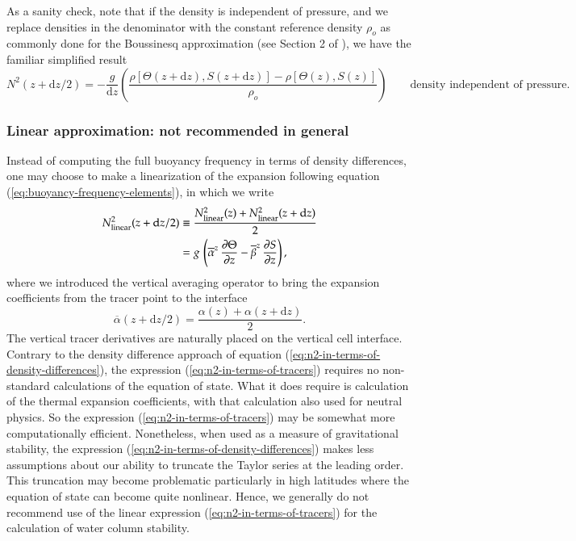 \normalsize As a sanity check, note that if the density is independent
of pressure, and we replace densities in the denominator with the
constant reference density $\rho_{o}$ as commonly done for the
Boussinesq approximation (see Section 2 of \cite{Roquet_etal2014}), we
have the familiar simplified result
\begin{equation}
N^{2}(z+\mathrm{d}z/2) = -\frac{g}{\mathrm{d}z} 
  \left( 
 \frac{ \rho[ \Theta(z + \mathrm{d} z), S(z + \mathrm{d} z)]  -\rho[ \Theta(z), S(z)]  }{\rho_{o}}
 \right)    \qquad   \mbox{density independent of pressure}.
\end{equation}


\subsubsection{Linear approximation: not recommended in general}

Instead of computing the full buoyancy frequency in terms of density
differences, one may choose to make a linearization of the expansion
following equation (\ref{eq:buoyancy-frequency-elements}), in which we
write
\begin{equation}
\begin{split}
N^{2}_{\mbox{\scriptsize linear}} (z+\mathrm{d}z/2) 
&\equiv \frac{N^{2}_{\mbox{\scriptsize linear}} (z) + N^{2}_{\mbox{\scriptsize linear}} (z+\mathrm{d}z)}{2}
\\
&= 
 g \, \left( \overline{\alpha}^{z}  \, \frac{\partial \Theta}{\partial z} 
               -\overline{\beta}^{z} \,  \frac{\partial S}{\partial z} \right),
\end{split}
\label{eq:n2-in-terms-of-tracers}
\end{equation} 
where we introduced the vertical averaging operator to bring the
expansion coefficients from the tracer point to the interface
\begin{equation}
  \overline{\alpha}(z+\mathrm{d}z/2) = \frac{\alpha(z) + \alpha(z+\mathrm{d}z)}{2}.
\end{equation}
The vertical tracer derivatives are naturally placed on the vertical
cell interface.  Contrary to the density difference approach of
equation (\ref{eq:n2-in-terms-of-density-differences}), the expression
(\ref{eq:n2-in-terms-of-tracers}) requires no non-standard
calculations of the equation of state.  What it does require is
calculation of the thermal expansion coefficients, with that
calculation also used for neutral physics.  So the expression
(\ref{eq:n2-in-terms-of-tracers}) may be somewhat more computationally
efficient.  Nonetheless, when used as a measure of gravitational
stability, the expression
(\ref{eq:n2-in-terms-of-density-differences}) makes less assumptions
about our ability to truncate the Taylor series at the leading order.
This truncation may become problematic particularly in high latitudes
where the equation of state can become quite nonlinear.  Hence, we
generally do not recommend use of the linear expression
(\ref{eq:n2-in-terms-of-tracers}) for the calculation of water column
stability.



